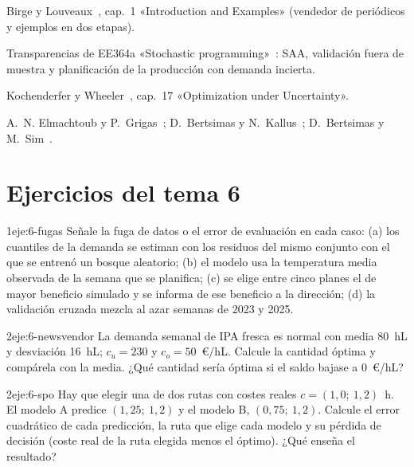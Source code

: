 \begin{lecturas}
\item Birge y Louveaux~\cite{bl}, cap.~1 «Introduction and Examples» (vendedor de periódicos y ejemplos en dos etapas).
\item Transparencias de EE364a «Stochastic programming»~\cite{ee364stoch}: SAA, validación fuera de muestra y planificación de la producción con demanda incierta.
\item Kochenderfer y Wheeler~\cite{kw}, cap.~17 «Optimization under Uncertainty».
\item A.~N. Elmachtoub y P.~Grigas~\cite{spo}; D.~Bertsimas y N.~Kallus~\cite{bk}; D.~Bertsimas y M.~Sim~\cite{bsim}.
\end{lecturas}

\section*{Ejercicios del tema 6}

\begin{ejercicio}{1}{eje:6-fugas}
Señale la fuga de datos o el error de evaluación en cada caso: (a) los cuantiles de la demanda se estiman con los residuos del mismo conjunto con el que se entrenó un bosque aleatorio; (b) el modelo usa la temperatura media observada de la semana que se planifica; (c) se elige entre cinco planes el de mayor beneficio simulado y se informa de ese beneficio a la dirección; (d) la validación cruzada mezcla al azar semanas de 2023 y 2025.
\end{ejercicio}

\begin{ejercicio}{2}{eje:6-newsvendor}
La demanda semanal de IPA fresca es normal con media 80~hL y desviación 16~hL; $c_u=230$ y $c_o=50$~€/hL. Calcule la cantidad óptima y compárela con la media. ¿Qué cantidad sería óptima si el saldo bajase a 0~€/hL?
\end{ejercicio}

\begin{ejercicio}{2}{eje:6-spo}
Hay que elegir una de dos rutas con costes reales $c=(1{,}0;\ 1{,}2)$~h. El modelo A predice $(1{,}25;\ 1{,}2)$ y el modelo B, $(0{,}75;\ 1{,}2)$. Calcule el error cuadrático de cada predicción, la ruta que elige cada modelo y su pérdida de decisión (coste real de la ruta elegida menos el óptimo). ¿Qué enseña el resultado?
\end{ejercicio}

